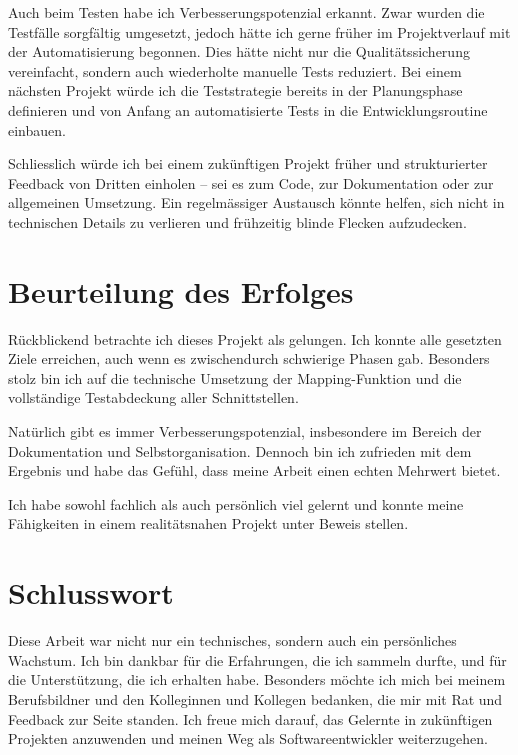 Auch beim Testen habe ich Verbesserungspotenzial erkannt. Zwar wurden die Testfälle sorgfältig umgesetzt, jedoch hätte ich gerne früher im Projektverlauf mit der Automatisierung begonnen. Dies hätte nicht nur die Qualitätssicherung vereinfacht, sondern auch wiederholte manuelle Tests reduziert. Bei einem nächsten Projekt würde ich die Teststrategie bereits in der Planungsphase definieren und von Anfang an automatisierte Tests in die Entwicklungsroutine einbauen.

Schliesslich würde ich bei einem zukünftigen Projekt früher und strukturierter Feedback von Dritten einholen – sei es zum Code, zur Dokumentation oder zur allgemeinen Umsetzung. Ein regelmässiger Austausch könnte helfen, sich nicht in technischen Details zu verlieren und frühzeitig blinde Flecken aufzudecken.

\section{Beurteilung des Erfolges}
Rückblickend betrachte ich dieses Projekt als gelungen. Ich konnte alle gesetzten Ziele erreichen, auch wenn es zwischendurch schwierige Phasen gab. Besonders stolz bin ich auf die technische Umsetzung der Mapping-Funktion und die vollständige Testabdeckung aller Schnittstellen.

Natürlich gibt es immer Verbesserungspotenzial, insbesondere im Bereich der Dokumentation und Selbstorganisation. Dennoch bin ich zufrieden mit dem Ergebnis und habe das Gefühl, dass meine Arbeit einen echten Mehrwert bietet.

Ich habe sowohl fachlich als auch persönlich viel gelernt und konnte meine Fähigkeiten in einem realitätsnahen Projekt unter Beweis stellen.

\section{Schlusswort}
Diese Arbeit war nicht nur ein technisches, sondern auch ein persönliches Wachstum. Ich bin dankbar für die Erfahrungen, die ich sammeln durfte, und für die Unterstützung, die ich erhalten habe. Besonders möchte ich mich bei meinem Berufsbildner und den Kolleginnen und Kollegen bedanken, die mir mit Rat und Feedback zur Seite standen. Ich freue mich darauf, das Gelernte in zukünftigen Projekten anzuwenden und meinen Weg als Softwareentwickler weiterzugehen.
